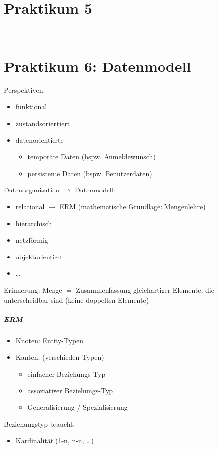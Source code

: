 \chapter{Praktikum 5}
--

\chapter{Praktikum 6: Datenmodell}
Perspektiven:
\begin{itemize}
\item funktional
\item zustandsorientiert
\item datenorientierte
\begin{itemize}
\item temporäre Daten (bspw. Anmeldewunsch)
\item persistente Daten (bspw. Benutzerdaten)
\end{itemize}
\end{itemize}
Datenorganisation $\to$ Datenmodell:
\begin{itemize}
\item relational $\to$ ERM (mathematische Grundlage: Mengenlehre)
\item hierarchisch
\item netzförmig
\item objektorientiert
\item …
\end{itemize}
Erinnerung: Menge $=$ Zusammenfassung gleichartiger Elemente, die unterscheidbar sind (keine doppelten Elemente)
\paragraph{ERM}
\begin{itemize}
\item Knoten: Entity-Typen
\item Kanten: (verschieden Typen)
\begin{itemize}
\item einfacher Beziehungs-Typ
\item assoziativer Beziehungs-Typ
\item Generalisierung / Spezialisierung
\end{itemize}
\end{itemize}
Beziehungstyp braucht: 
\begin{itemize}
\item Kardinalität (1-n, n-n, …)
\end{itemize}

